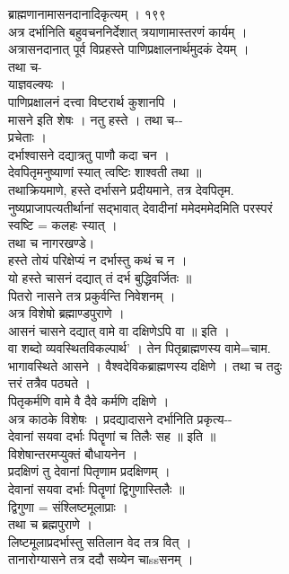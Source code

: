 \documentclass[11pt, openany]{book}
\begin{document}
{{{{{{{{ }{ब्राह्मणानामासनदानादिकृत्यम् । १९९}{\\
अत्र दर्भानिति बहुवचननिर्देशात् त्रयाणामास्तरणं कार्यम् ।\\
अत्रासनदानात् पूर्व विप्रहस्ते पाणिप्रक्षालनार्थमुदकं देयम् ।\\
तथा च-\\
याज्ञवल्क्यः ।\\
पाणिप्रक्षालनं दत्त्वा विष्टरार्थ कुशानपि ।\\
मासने इति शेषः । नतु हस्ते । तथा च-\/-\\
प्रचेताः ।\\
दर्भाश्वासने दद्यात्रतु पाणौ कदा चन ।\\
देवपितृमनुष्याणां स्यात् त्वष्टिः शाश्वती तथा ॥\\
तथाक्रियमाणे, हस्ते दर्भासने प्रदीयमाने, तत्र देवपितृम.\\
नुष्यप्राजापत्यतीर्थानां सद्भावात् देवादीनां ममेदममेदमिति परस्परं\\
स्वष्टि = कलहः स्यात् ।\\
तथा च नागरखण्डे।\\
हस्ते तोयं परिक्षेप्यं न दर्भास्तु कथं च न ।\\
यो हस्ते चासनं दद्यात् तं दर्भ बुद्धिवर्जितः ॥\\
पितरो नासने तत्र प्रकुर्वन्ति निवेशनम् ।\\
अत्र विशेषो ब्रह्माण्डपुराणे ।\\
आसनं चासने दद्यात् वामे वा दक्षिणेऽपि वा ॥ इति ।\\
वा शब्दो व्यवस्थितविकल्पार्थ' । तेन पितृब्राह्मणस्य वामे=चाम.\\
भागावस्थिते आसने । वैश्वदेविकब्राह्मणस्य दक्षिणे । तथा च तदुः\\
त्तरं तत्रैव पठ्यते ।\\
पितृकर्मणि वामे वै दैवे कर्मणि दक्षिणे ।\\
अत्र काठके विशेषः । प्रदद्यादासने दर्भानिति प्रकृत्य-\/-\\
देवानां सयवा दर्भाः पितॄणां च तिलैः सह ॥ इति ॥\\
विशेषान्तरमप्युक्तं बौधायनेन ।\\
प्रदक्षिणं तु देवानां पितृणाम प्रदक्षिणम् ।\\
देवानां सयवा दर्भाः पितॄणां द्विगुणास्तिलैः ॥\\
द्विगुणा = संश्लिष्टमूलाप्राः ।\\
तथा च ब्रह्मपुराणे ।\\
लिष्टमूलाप्रदर्भास्तु सतिलान वेद तत्र वित् ।\\
तानारोग्यासने तत्र ददौ सव्येन चाssसनम् ।\textbar{}}

}}}}}}}
\end{document}
